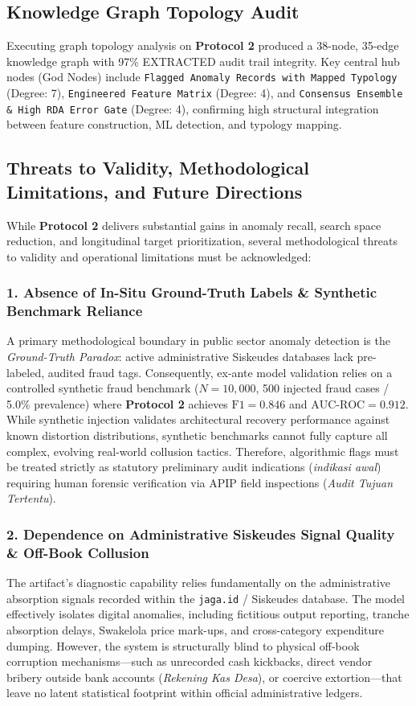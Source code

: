 \documentclass[runningheads]{llncs}
\begin{document}
\subsection{Knowledge Graph Topology Audit}
Executing graph topology analysis on \textbf{Protocol 2} produced a 38-node, 35-edge knowledge graph with 97\% EXTRACTED audit trail integrity. Key central hub nodes (God Nodes) include \texttt{Flagged Anomaly Records with Mapped Typology} (Degree: 7), \texttt{Engineered Feature Matrix} (Degree: 4), and \texttt{Consensus Ensemble \& High RDA Error Gate} (Degree: 4), confirming high structural integration between feature construction, ML detection, and typology mapping.

\subsection{Threats to Validity, Methodological Limitations, and Future Directions}
While \textbf{Protocol 2} delivers substantial gains in anomaly recall, search space reduction, and longitudinal target prioritization, several methodological threats to validity and operational limitations must be acknowledged:

\subsubsection{1. Absence of In-Situ Ground-Truth Labels \& Synthetic Benchmark Reliance}
A primary methodological boundary in public sector anomaly detection is the \textit{Ground-Truth Paradox}: active administrative Siskeudes databases lack pre-labeled, audited fraud tags. Consequently, ex-ante model validation relies on a controlled synthetic fraud benchmark ($N=10,000$, 500 injected fraud cases / 5.0\% prevalence) where \textbf{Protocol 2} achieves $\text{F1}=0.846$ and $\text{AUC-ROC}=0.912$. While synthetic injection validates architectural recovery performance against known distortion distributions, synthetic benchmarks cannot fully capture all complex, evolving real-world collusion tactics. Therefore, algorithmic flags must be treated strictly as statutory preliminary audit indications (\textit{indikasi awal}) requiring human forensic verification via APIP field inspections (\textit{Audit Tujuan Tertentu}).

\subsubsection{2. Dependence on Administrative Siskeudes Signal Quality \& Off-Book Collusion}
The artifact's diagnostic capability relies fundamentally on the administrative absorption signals recorded within the \texttt{jaga.id} / Siskeudes database. The model effectively isolates digital anomalies, including fictitious output reporting, tranche absorption delays, Swakelola price mark-ups, and cross-category expenditure dumping. However, the system is structurally blind to physical off-book corruption mechanisms---such as unrecorded cash kickbacks, direct vendor bribery outside bank accounts (\textit{Rekening Kas Desa}), or coercive extortion---that leave no latent statistical footprint within official administrative ledgers.
\end{document}
